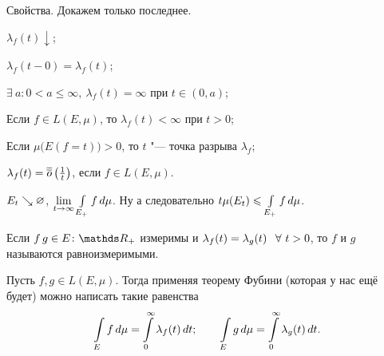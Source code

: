 \begin{Ut}
Свойства. Докажем только последнее.
\begin{roItems}
  \item $\lambda_f(t)\downarrow$;
  \item $\lambda_f(t-0)=\lambda_f(t)$;
  \item $\exists\ a\colon 0<a\le \infty,\ \lambda_f(t)=\infty$ при $t\in(0,a)$;
  \item Если $f\in L(E,\mu)$, то $\lambda_f(t)<\infty$ при $t>0$;
  \item Если $\mu\big(E(f=t)\big)>0$, то $t$ "--- точка разрыва $\lambda_f$;
  \item $\lambda_f(t) = \overline{\overline o}\left(\frac1t\right)$, если $f\in L(E,\mu)$.
\end{roItems}
\end{Ut}
\begin{Proof}
$E_t\searrow \varnothing$, $\lim\limits_{t\rightarrow\infty} \int\limits_{E_+}f\,d\mu$. Ну а следовательно $t\mu(E_t)\leqslant \int\limits_{E_+}f\,d\mu$.
\end{Proof}

\begin{Def}
  Если $f\,g\in E\colon \R_+$ измеримы и $\lambda_f(t) = \lambda_g(t)\pau \forall\ t>0$, то $f$ и $g$ называются равноизмеримыми.
\end{Def}

Пусть $f,g\in L(E,\mu)$. Тогда применяя теорему Фубини (которая у нас ещё будет) можно написать такие равенства 
\[\int\limits_{E}f\,d\mu = \int\limits_0^\infty\lambda_f(t)\,dt;\qquad \int\limits_{E}g\,d\mu = \int\limits_0^\infty\lambda_g(t)\,dt.\]

